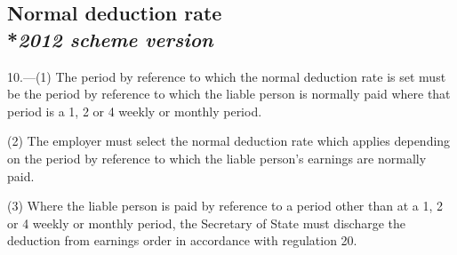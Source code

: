 \documentclass[12pt,a4paper]{article}
\begin{document}
%
%


\subsection[10. Normal deduction rate --- \emph{2012 scheme version}]{Normal deduction rate\\*\emph{2012 scheme version}}

10.---(1)  The period by reference to which the normal deduction rate is set must be the period by reference to which the liable person is normally paid where that period is a 1, 2 or 4 weekly or monthly period.

(2) The employer must select the normal deduction rate which applies depending on the period by reference to which the liable person’s earnings are normally paid.

(3) Where the liable person is paid by reference to a period other than at a 1, 2 or 4 weekly or monthly period, the Secretary of State must discharge the deduction from earnings order in accordance with regulation 20.
\end{document}
